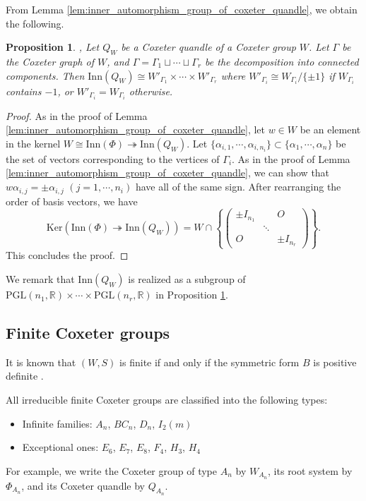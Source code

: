 \documentclass{amsart}
\newtheorem{proposition}[theorem]{Proposition}
\theoremstyle{definition}
\theoremstyle{remark}
\numberwithin{equation}{section}
\begin{document}
From Lemma \ref{lem:inner_automorphism_group_of_coxeter_quandle}, 
we obtain the following.
\begin{proposition}
\label{prop:inner_automorphism_group_of_coxeter_quandle}, 
Let $Q_W$ be a Coxeter quandle of a Coxeter group $W$.
Let $\Gamma$ be the Coxeter graph of $W$, and 
$\Gamma = \Gamma_1 \sqcup \cdots \sqcup \Gamma_r$ be the decomposition into 
connected components.
Then $\mathrm{Inn} (Q_W) \cong W'_{\Gamma_1} \times \cdots \times W'_{\Gamma_r}$
where $W'_{\Gamma_i} \cong W_{\Gamma_i} / \{ \pm 1 \}$ if $W_{\Gamma_i}$ contains $-1$, 
or $W'_{\Gamma_i} = W_{\Gamma_i}$ otherwise.
\end{proposition}
\begin{proof}
As in the proof of Lemma \ref{lem:inner_automorphism_group_of_coxeter_quandle}, 
let $w \in W$ be an element in the kernel 
$W \cong \mathrm{Inn} (\Phi) \twoheadrightarrow \mathrm{Inn} (Q_W)$.
Let $\{ \alpha_{i, 1}, \cdots , \alpha_{i, n_i} \} \subset 
\{ \alpha_1, \cdots , \alpha_n \}$ be the set of vectors corresponding to 
the vertices of $\Gamma_i$.
As in the proof of Lemma \ref{lem:inner_automorphism_group_of_coxeter_quandle}, 
we can show that $w \alpha_{i, j} = \pm \alpha_{i, j }$ $(j = 1, \cdots , n_i)$ 
have all of the same sign. 
After rearranging the order of basis vectors, we have
\[
\mathrm{Ker} (\mathrm{Inn} (\Phi) \twoheadrightarrow \mathrm{Inn} (Q_W)) 
= W \cap \left\{ 
\begin{pmatrix} 
\pm I_{n_1} & & O \\ 
& \ddots &  \\ 
O &  & \pm I_{n_r} 
\end{pmatrix} 
\right\}.
\]
This concludes the proof.
\end{proof}

We remark that $\mathrm{Inn} (Q_W)$ is realized as a subgroup of 
$\mathrm{PGL}(n_1, \mathbb{R}) \times \cdots \times \mathrm{PGL}(n_r, \mathbb{R} )$
in Proposition \ref{prop:inner_automorphism_group_of_coxeter_quandle}.


\subsection{Finite Coxeter groups}
\label{subsec:finite_coxeter_groups}
It is known that $(W, S)$ is finite 
if and only if the symmetric form $B$ is positive definite
\cite[Theorem 6.4]{Humphreys}.

All irreducible finite Coxeter groups are classified into the following types:
\begin{itemize}
\item Infinite families: $A_n$, $BC_n$, $D_n$, $I_2(m)$
\item Exceptional ones: $E_6$, $E_7$, $E_8$, $F_4$, $H_3$, $H_4$
\end{itemize}
For example, we write the Coxeter group of type $A_n$ by $W_{A_n}$, 
its root system by $\Phi_{A_n}$, and its Coxeter quandle by $Q_{A_n}$.
\end{document}
